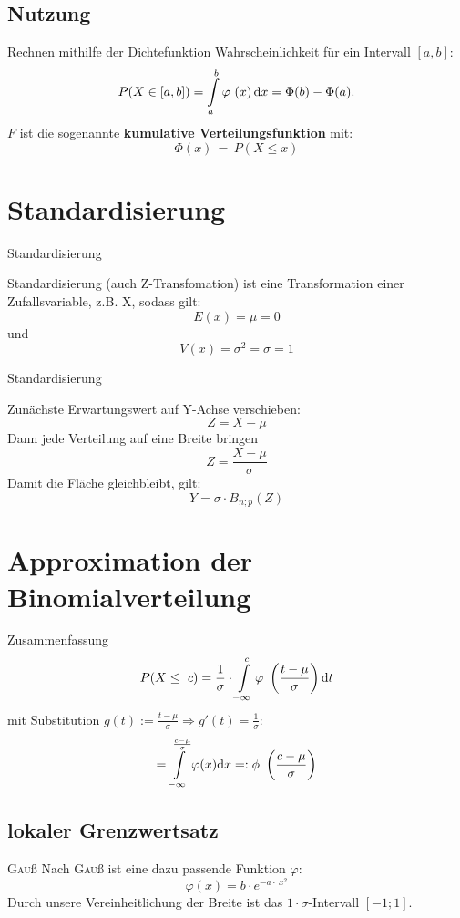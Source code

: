 \documentclass[14pt]{beamer}
\begin{document}
\subsection{Nutzung}
\begin{frame}{Rechnen mithilfe der Dichtefunktion}
Wahrscheinlichkeit für ein Intervall $[a,b]$:
$$P(X\in [a,b]) = \int\displaylimits_a^b \varphi\ (x)\, {\rm d}x = \Phi(b)-\Phi(a).$$
$F$ ist die sogenannte \textbf{kumulative Verteilungsfunktion} mit:
$$\Phi(x) \, = \, P(X \le x)$$
\end{frame}


\section{Standardisierung}

\begin{frame} {Standardisierung}

Standardisierung (auch Z-Transfomation) ist eine Transformation einer Zufallsvariable, z.B. X, sodass gilt: $$E(x) = \mu = 0$$ und $$V(x) = \sigma^2 = \sigma = 1$$

\end{frame}

\begin{frame} {Standardisierung}

Zunächste Erwartungswert auf Y-Achse verschieben:
$$ Z = X - \mu $$
Dann jede Verteilung auf eine Breite bringen
$$ Z = \frac{X - \mu}{\sigma} $$
Damit die Fläche gleichbleibt, gilt:
$$ Y = \sigma \cdot B_{n;p}(Z) $$

\end{frame}




\section{Approximation der Binomialverteilung}


\begin{frame}{Zusammenfassung}
$$
P(X\leq\ c) = \frac{1}{\sigma} \cdot \int\displaylimits^c_{-\infty} \varphi\ \left(\frac{t-\mu}{\sigma}\right) {\mathrm d}t
$$
mit Substitution $g(t):=\frac{t-\mu}{\sigma} \Rightarrow g'(t)=\frac{1}{\sigma}$:
$$
= \int\displaylimits^{\frac{c-\mu}{\sigma}}_{-\infty} \varphi(x) {\mathrm d}x =: \phi\ \left(\frac{c-\mu}{\sigma}\right) $$
\end{frame}

\subsection{lokaler Grenzwertsatz}
\begin{frame}{\textrm{\textsc{Gau}ß}}
Nach \textrm{\textsc{Gau}ß} ist eine dazu passende Funktion $\varphi$:
$$
\varphi(x)=b\cdot e^{-a\cdot\ x^2}
$$
Durch unsere Vereinheitlichung der Breite ist das $1\cdot \sigma$-Intervall $[-1;1]$.
\end{frame}
\end{document}
